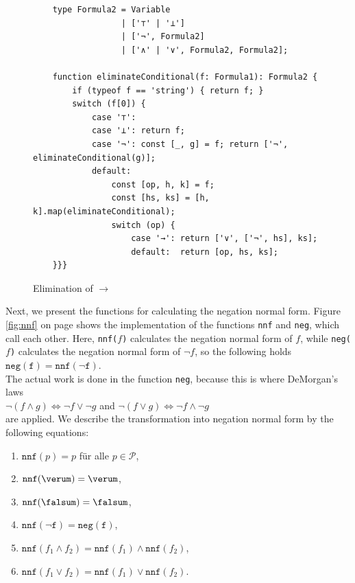 \begin{figure}[!ht]
  \centering
\begin{verbatim}
    type Formula2 = Variable 
                  | ['⊤' | '⊥'] 
                  | ['¬', Formula2]
                  | ['∧' | '∨', Formula2, Formula2];
                  
    function eliminateConditional(f: Formula1): Formula2 {
        if (typeof f == 'string') { return f; }
        switch (f[0]) {
            case '⊤':
            case '⊥': return f;
            case '¬': const [_, g] = f; return ['¬', eliminateConditional(g)]; 
            default: 
                const [op, h, k] = f;
                const [hs, ks] = [h, k].map(eliminateConditional);
                switch (op) {
                    case '→': return ['∨', ['¬', hs], ks];
                    default:  return [op, hs, ks];                              
    }}}
\end{verbatim}
\vspace*{-0.3cm}
  \caption{Elimination of $\rightarrow$}
  \label{fig:eliminate-folgt}
\end{figure}
\pagebreak
Next, we present the functions for calculating the negation normal form.
Figure
\ref{fig:nnf} on page \pageref{fig:nnf} shows the implementation of the functions
\texttt{nnf} and \texttt{neg},
which call each other.  Here, \texttt{nnf($f$)} calculates the negation normal form of $f$, while  
\texttt{neg($f$)} calculates the negation normal form of $\neg f$, so the following holds
\\[0.2cm]
\hspace*{1.3cm}
$\texttt{neg}(\texttt{f}) = \texttt{nnf}(\neg \texttt{f})$.
\\[0.2cm]
 The actual work is done in the
function \texttt{neg}, because this is where DeMorgan's laws 
\\[0.2cm]
\hspace*{1.3cm}
$\neg (f \wedge g) \Leftrightarrow \neg f \vee \neg g$ \quad and \quad 
$\neg (f \vee g) \Leftrightarrow \neg f \wedge \neg g$ 
\\[0.2cm]
are applied.  We describe the transformation into negation normal form by 
the following equations: 
\begin{enumerate}
\item $\texttt{nnf}(p) = p$ \quad für alle $p \in \mathcal{P}$,
\item $\texttt{nnf}(\verum) = \verum$,
\item $\texttt{nnf}(\falsum) = \falsum$,
\item $\texttt{nnf}(\neg \texttt{f}) = \texttt{neg}(\texttt{f})$,
\item $\texttt{nnf}(f_1 \wedge f_2) = \texttt{nnf}(f_1) \wedge \texttt{nnf}(f_2)$,
\item $\texttt{nnf}(f_1 \vee f_2) = \texttt{nnf}(f_1) \vee \texttt{nnf}(f_2)$.
\end{enumerate}

